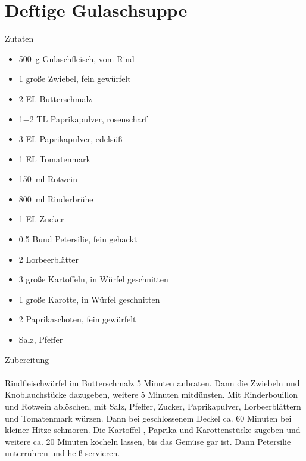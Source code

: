 \section*{Deftige Gulaschsuppe}
\ihead{}\ohead{}
\cfoot{}
{\Large Zutaten}
\begin{multicols}{2}
\begin{itemize}
    \item \SI{500}{g} Gulaschfleisch, vom Rind
    \item \num{1} große Zwiebel, fein gewürfelt
    \item \num{2} EL Butterschmalz
    \item \num{1-2} TL Paprikapulver, rosenscharf
    \item \num{3} EL Paprikapulver, edelsüß
    \item \num{1} EL Tomatenmark
    \item \SI{150}{ml} Rotwein
    \item \SI{800}{ml} Rinderbrühe
    \item \num{1} EL Zucker
    \item \num{0,5} Bund Petersilie, fein gehackt
    \item \num{2} Lorbeerblätter
    \item \num{3} große Kartoffeln, in Würfel geschnitten
    \item \num{1} große Karotte, in Würfel geschnitten
    \item \num{2} Paprikaschoten, fein gewürfelt
    \item Salz, Pfeffer
\end{itemize}
\end{multicols}
\noindent
{\Large Zubereitung}\\
\\
Rindfleischwürfel im Butterschmalz 5 Minuten anbraten.
Dann die Zwiebeln und Knoblauchstücke dazugeben, weitere 5 Minuten mitdünsten.
Mit Rinderbouillon und Rotwein ablöschen, mit Salz, Pfeffer, Zucker, Paprikapulver, Lorbeerblättern und Tomatenmark würzen.
Dann bei geschlossenem Deckel ca. 60 Minuten bei kleiner Hitze schmoren.
Die Kartoffel-, Paprika und Karottenstücke zugeben und weitere ca. 20 Minuten köcheln lassen, bis das Gemüse gar ist.
Dann Petersilie unterrühren und heiß servieren.
